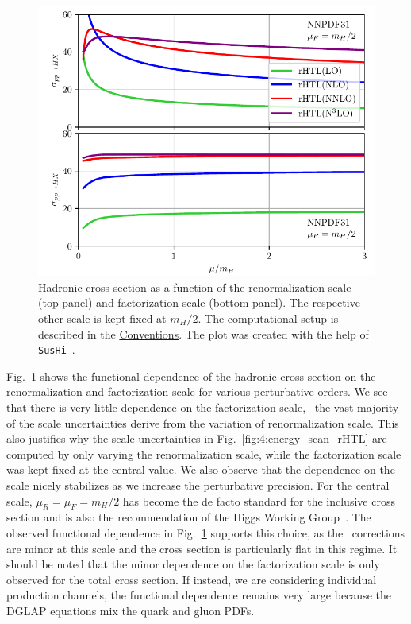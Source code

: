 \begin{figure}[ht]
\centering
\includegraphics[width=\figurewidth]{Images/scale_scan.pdf}
\caption{Hadronic cross section as a function of the renormalization scale (top panel) and factorization scale (bottom panel). The respective other scale is kept fixed at $m_H/2$. The computational setup is described in the \hyperref[chap:notation_and_conventions]{Conventions}. The plot was created with the help of \texttt{SusHi}~\cite{Harlander:2012pb, Harlander:2016hcx}.}
\label{fig:4:scale_scan}
\end{figure}
Fig.~\ref{fig:4:scale_scan} shows the functional dependence of the hadronic cross section on the renormalization and factorization scale for various perturbative orders. We see that there is very little dependence on the factorization scale, \ie\ the vast majority of the scale uncertainties derive from the variation of renormalization scale. This also justifies why the scale uncertainties in Fig.~\ref{fig:4:energy_scan_rHTL} are computed by only varying the renormalization scale, while the factorization scale was kept fixed at the central value. We also observe that the dependence on the scale nicely stabilizes as we increase the perturbative precision. For the central scale, $\mu_R = \mu_F = m_H/2$ has become the de facto standard for the inclusive cross section and is also the recommendation of the Higgs Working Group~\cite{LHCHiggsCrossSectionWorkingGroup:2016ypw}. The observed functional dependence in Fig.~\ref{fig:4:scale_scan} supports this choice, as the \NNNLO\ corrections are minor at this scale and the cross section is particularly flat in this regime. It should be noted that the minor dependence on the factorization scale is only observed for the total cross section. If instead, we are considering individual production channels, the functional dependence remains very large because the DGLAP equations mix the quark and gluon \acs{PDF}s.

